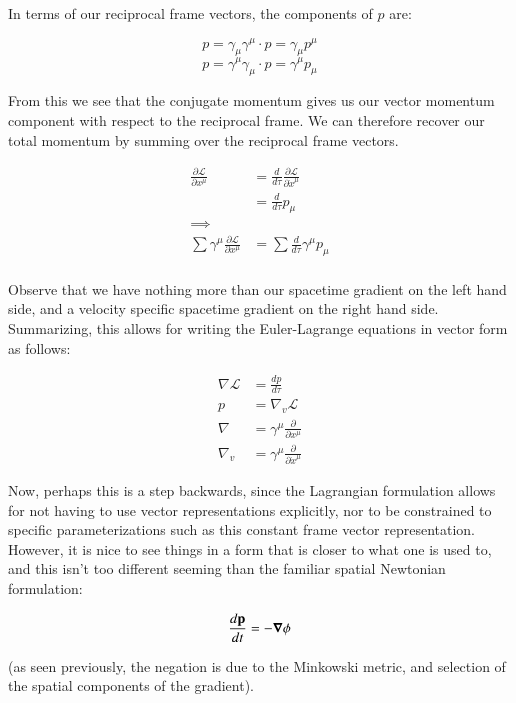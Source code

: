 \documentclass{article}
\newcommand{\xdot}[0]{\dot{x}}
\newcommand{\PD}[2]{\frac{\partial {#2}}{\partial {#1}}}
\newcommand{\grad}[0]{\nabla}
\newcommand{\spacegrad}[0]{\boldsymbol{\nabla}}
\newcommand{\LL}[0]{\mathcal{L}}
\begin{document}
In terms of our reciprocal frame vectors, the components of $p$ are:

\begin{equation*}
p = \gamma_{\mu} \gamma^{\mu} \cdot p = \gamma_{\mu} p^{\mu}
\end{equation*}
\begin{equation*}
p = \gamma^{\mu} \gamma_{\mu} \cdot p = \gamma^{\mu} p_{\mu}
\end{equation*}

From this we see that the conjugate momentum gives us our vector momentum 
component with respect to the reciprocal frame.  We can therefore recover 
our total momentum by summing over the reciprocal frame vectors.

\begin{align*}
\PD{x^{\mu}}{\LL} 
&= \frac{d}{d\tau}\PD{\xdot^{\mu}}{\LL} \\
&= \frac{d}{d\tau} p_{\mu} \\
\implies \\
\sum \gamma^{\mu} \PD{x^{\mu}}{\LL} &= \sum \frac{d}{d\tau} \gamma^{\mu} p_{\mu} \\
\end{align*}

Observe that we have nothing more than our spacetime gradient on the left hand side, and a velocity
specific spacetime gradient on the right hand side.  Summarizing, this allows for writing the Euler-Lagrange equations in vector form as follows:

\begin{align}
\grad \LL &= \frac{d p}{d\tau} \\
p &= \grad_v \LL \\
\grad &= \gamma^{\mu} \PD{x^{\mu}}{} \\
\grad_v &= \gamma^{\mu} \PD{\xdot^{\mu}}{}
\end{align}

Now, perhaps this is a step backwards, since the Lagrangian formulation allows for not having to use vector representations explicitly, nor to be constrained to specific parameterizations such as this constant frame vector representation.  However, it is nice to see things in a form that is closer to what one is used to, and this isn't too different seeming than the familiar spatial Newtonian formulation:

\begin{equation*}
\frac{d\Bp}{dt} = -\spacegrad \phi
\end{equation*}

(as seen previously, the negation is due to the Minkowski metric, and selection of the spatial components of the gradient).
\end{document}
